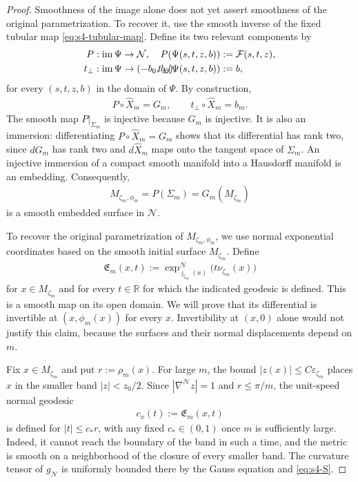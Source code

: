 \documentclass[a4paper,11pt,oneside,reqno]{amsart}
\numberwithin{equation}{section}
\theoremstyle{definition}
\begin{document}
\begin{proof}
    Smoothness of the image alone does not yet assert smoothness
    of the original parametrization. To recover it, use the
    smooth inverse of the fixed tubular map
    \eqref{eq:s4-tubular-map}. Define its two relevant components
    by
    \begin{align*}
        P:\operatorname{im}\Psi&\rightarrow\mathcal N,
        &\hspace{-1cm}P(\Psi(s,t,z,b))&:=\mathcal F(s,t,z),\\
        t_\perp:\operatorname{im}\Psi&\rightarrow(-b_0,b_0),
        &\hspace{-1cm}t_\perp(\Psi(s,t,z,b))&:=b,
    \end{align*}
    for every $(s,t,z,b)$ in the domain of $\Psi$.
    By construction,
    \begin{align*}
        P\circ\widehat X_m=G_m,
        \qquad
        t_\perp\circ\widehat X_m=b_m.
    \end{align*}
    The smooth map $P|_{\Sigma_m}$ is injective because $G_m$
    is injective. It is also an immersion: differentiating
    $P\circ\widehat X_m=G_m$ shows that its differential has
    rank two, since $dG_m$ has rank two and $d\widehat X_m$
    maps onto the tangent space of $\Sigma_m$.
    An injective immersion of a compact smooth manifold into
    a Hausdorff manifold is an embedding. Consequently,
    \begin{align*}
        M_{\zeta_m,\phi_m}=P(\Sigma_m)=G_m(M_{\zeta_m})
    \end{align*}
    is a smooth embedded surface in $\mathcal N$.

    To recover the original parametrization of
    $M_{\zeta_m,\phi_m}$, we use
    normal exponential coordinates based on the smooth initial
    surface $M_{\zeta_m}$. Define
    \begin{align*}
        \mathfrak E_m(x,t)
        :=\exp_{\jmath_{\zeta_m}(x)}^{\mathcal N}
          \bigl(t\nu_{\zeta_m}(x)\bigr)
    \end{align*}
    for $x\in M_{\zeta_m}$ and for every $t\in\mathbb R$
    for which the indicated geodesic is defined. This is a smooth
    map on its open domain. We will prove that its differential
    is invertible at $(x,\phi_m(x))$ for every $x$.
    Invertibility at $(x,0)$ alone would not justify this claim,
    because the surfaces and their normal displacements depend
    on $m$.

    Fix $x\in M_{\zeta_m}$ and put $r:=\rho_m(x)$.
    For large $m$, the bound $|z(x)|\leq C\varepsilon_{\zeta_m}$
    places $x$ in the smaller band $|z|<z_0/2$.
    Since $|\nabla^{\mathcal N}z|=1$ and $r\leq\pi/m$,
    the unit-speed normal geodesic
    \begin{align*}
        c_x(t):=\mathfrak E_m(x,t)
    \end{align*}
    is defined for $|t|\leq c_*r$, with any fixed
    $c_*\in(0,1)$ once $m$ is sufficiently large.
    Indeed, it cannot reach the boundary of the band in such
    a time, and the metric is smooth on a neighborhood of
    the closure of every smaller band. The curvature tensor
    of $g_{\mathcal N}$ is uniformly bounded there by the Gauss equation and
    \eqref{eq:s4-S}.


\end{proof}
\end{document}
